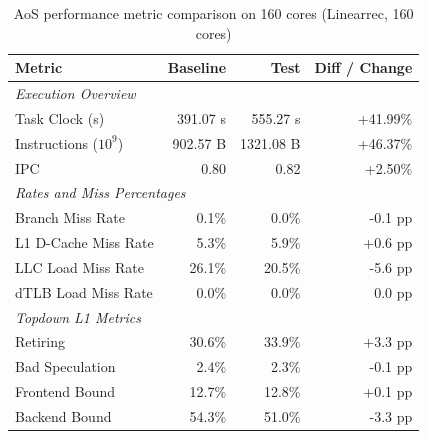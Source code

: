 \begin{table}[htbp]
  \centering
  \caption{AoS performance metric comparison on 160 cores (Linearrec, 160 cores)}
  \label{tab:perf_comparison_aos_linearrec_160cores}
  \begin{tabular}{lrrr}
    \toprule
    \textbf{Metric} & \textbf{Baseline} & \textbf{Test} & \textbf{Diff / Change} \\
    \midrule
    \multicolumn{4}{l}{\textit{Execution Overview}} \\
    \quad Task Clock (s)           & 391.07 s   & 555.27 s   & +41.99\%   \\
    \quad Instructions ($10^9$)    & 902.57 B  & 1321.08 B  & +46.37\%   \\
    \quad IPC                      & 0.80       & 0.82       & +2.50\%    \\
    \midrule
    \multicolumn{4}{l}{\textit{Rates and Miss Percentages}} \\
    \quad Branch Miss Rate         & 0.1\%      & 0.0\%      & -0.1 pp    \\
    \quad L1 D-Cache Miss Rate     & 5.3\%      & 5.9\%      & +0.6 pp    \\
    \quad LLC Load Miss Rate       & 26.1\%     & 20.5\%     & -5.6 pp    \\
    \quad dTLB Load Miss Rate      & 0.0\%      & 0.0\%      & 0.0 pp     \\
    \midrule
    \multicolumn{4}{l}{\textit{Topdown L1 Metrics}} \\
    \quad Retiring                 & 30.6\%     & 33.9\%     & +3.3 pp   \\
    \quad Bad Speculation          & 2.4\%     & 2.3\%     & -0.1 pp   \\
    \quad Frontend Bound           & 12.7\%     & 12.8\%     & +0.1 pp   \\
    \quad Backend Bound            & 54.3\%     & 51.0\%     & -3.3 pp   \\
    \bottomrule
  \end{tabular}
\end{table}
